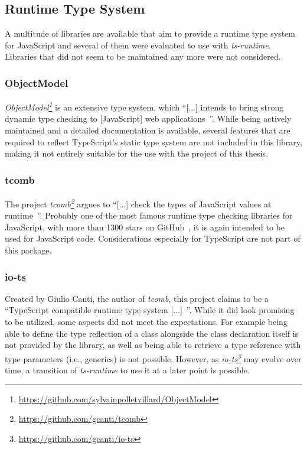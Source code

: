 
\subsection{Runtime Type System}
\label{sec:runtime-type-system}

A multitude of libraries are available that aim to provide a runtime type system for JavaScript and several of them were evaluated to use with \emph{ts-runtime}. Libraries that did not seem to be maintained any more were not considered.

\subsubsection{ObjectModel}

\emph{ObjectModel\footnote{\url{https://github.com/sylvainpolletvillard/ObjectModel}}} is an extensive type system, which ``[...] intends to bring strong dynamic type checking to [JavaScript] web applications~\cite{RuntimeTypeSystem:ObjectModel}''. While being actively maintained and a detailed documentation is available, several features that are required to reflect TypeScript's static type system are not included in this library, making it not entirely suitable for the use with the project of this thesis.

\subsubsection{tcomb}

The project \emph{tcomb\footnote{\url{https://github.com/gcanti/tcomb}}} argues to ``[...] check the types of JavaScript values at runtime~\cite{RuntimeTypeSystem:tcomb}''. Probably one of the most famous runtime type checking libraries for JavaScript, with more than 1300 stars on GitHub~\cite{RuntimeTypeSystem:tcomb}, it is again intended to be used for JavaScript code. Considerations especially for TypeScript are not part of this package.

\subsubsection{io-ts}

Created by Giulio Canti, the author of \emph{tcomb}, this project claims to be a ``TypeScript compatible runtime type system [...]~\cite{RuntimeTypeSystem:io-ts}''. While it did look promising to be utilized, some aspects did not meet the expectations. For example being able to define the type reflection of a class alongside the class declaration itself is not provided by the library, as well as being able to retrieve a type reference with type parameters (i.e., generics) is not possible. However, as \emph{io-ts\footnote{\url{https://github.com/gcanti/io-ts}}} may evolve over time, a transition of \emph{ts-runtime} to use it at a later point is possible.

